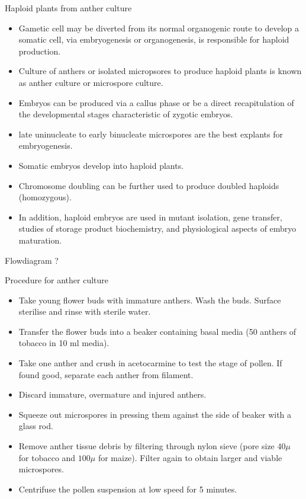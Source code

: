 \documentclass[
  ignorenonframetext,
  aspectratio=169]{beamer}
\providecommand{\tightlist}{%
  \setlength{\itemsep}{0pt}\setlength{\parskip}{0pt}}
\begin{document}
\begin{frame}{Haploid plants from anther culture}
\protect\hypertarget{haploid-plants-from-anther-culture}{}
\begin{itemize}
\tightlist
\item
  Gametic cell may be diverted from its normal organogenic route to
  develop a somatic cell, via embryogenesis or organogenesis, is
  responsible for haploid production.
\item
  Culture of anthers or isolated micropsores to produce haploid plants
  is known as anther culture or microspore culture.
\item
  Embryos can be produced via a callus phase or be a direct
  recapitulation of the developmental stages characteristic of zygotic
  embryos.
\item
  late uninucleate to early binucleate microspores are the best explants
  for embryogenesis.
\item
  Somatic embryos develop into haploid plants.
\end{itemize}
\end{frame}

\begin{frame}{}
\protect\hypertarget{section-3}{}
\begin{itemize}
\tightlist
\item
  Chromosome doubling can be further used to produce doubled haploids
  (homozygous).
\item
  In addition, haploid embryos are used in mutant isolation, gene
  transfer, studies of storage product biochemistry, and physiological
  aspects of embryo maturation.
\end{itemize}

Flowdiagram ?
\end{frame}

\begin{frame}{Procedure for anther culture}
\protect\hypertarget{procedure-for-anther-culture}{}
\begin{itemize}
\tightlist
\item
  Take young flower buds with immature anthers. Wash the buds. Surface
  sterilise and rinse with sterile water.
\item
  Transfer the flower buds into a beaker containing basal media (50
  anthers of tobacco in 10 ml media).
\item
  Take one anther and crush in acetocarmine to test the stage of pollen.
  If found good, separate each anther from filament.
\item
  Discard immature, overmature and injured anthers.
\item
  Squeeze out microspores in pressing them against the side of beaker
  with a glass rod.
\item
  Remove anther tissue debris by filtering through nylon sieve (pore
  size \(40\mu\) for tobacco and \(100\mu\) for maize). Filter again to
  obtain larger and viable microspores.
\item
  Centrifuse the pollen suspension at low speed for 5 minutes.
\end{itemize}
\end{frame}
\end{document}
